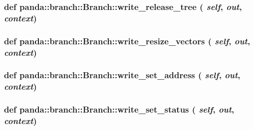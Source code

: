 \label{classpanda_1_1branch_1_1Branch_a84762a0e9ebcac10bd421a1f1ab5edb1}
\hypertarget{classpanda_1_1branch_1_1Branch_ad9b2a0293cf145028350b6c9085f4e8f}{
\subsubsection[{write\_\-release\_\-tree}]{\setlength{\rightskip}{0pt plus 5cm}def panda::branch::Branch::write\_\-release\_\-tree ( {\em self}, \/   {\em out}, \/   {\em context})}}
\label{classpanda_1_1branch_1_1Branch_ad9b2a0293cf145028350b6c9085f4e8f}
\hypertarget{classpanda_1_1branch_1_1Branch_ad8ad0994d7e6cbdf7d68572d942f9873}{
\subsubsection[{write\_\-resize\_\-vectors}]{\setlength{\rightskip}{0pt plus 5cm}def panda::branch::Branch::write\_\-resize\_\-vectors ( {\em self}, \/   {\em out}, \/   {\em context})}}
\label{classpanda_1_1branch_1_1Branch_ad8ad0994d7e6cbdf7d68572d942f9873}
\hypertarget{classpanda_1_1branch_1_1Branch_a31c2ee7d2aa515eb15dd62e38b9fcffd}{
\subsubsection[{write\_\-set\_\-address}]{\setlength{\rightskip}{0pt plus 5cm}def panda::branch::Branch::write\_\-set\_\-address ( {\em self}, \/   {\em out}, \/   {\em context})}}
\label{classpanda_1_1branch_1_1Branch_a31c2ee7d2aa515eb15dd62e38b9fcffd}
\hypertarget{classpanda_1_1branch_1_1Branch_a1d1a6885ab00f4d6245c223a91f9d10f}{
\subsubsection[{write\_\-set\_\-status}]{\setlength{\rightskip}{0pt plus 5cm}def panda::branch::Branch::write\_\-set\_\-status ( {\em self}, \/   {\em out}, \/   {\em context})}}
